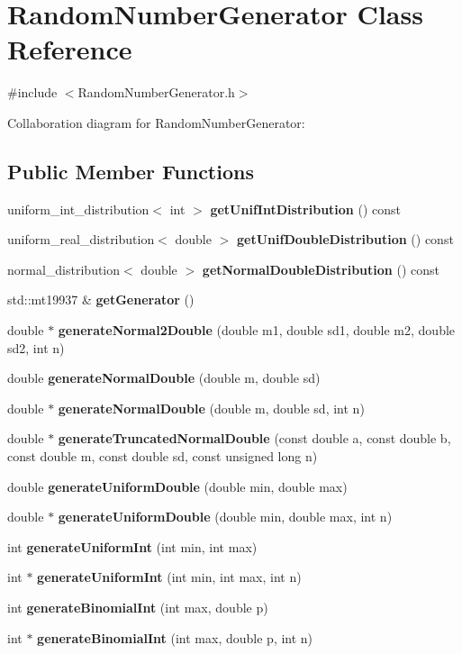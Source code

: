 \section{Random\+Number\+Generator Class Reference}
\label{class_random_number_generator}


{\ttfamily \#include $<$Random\+Number\+Generator.\+h$>$}



Collaboration diagram for Random\+Number\+Generator\+:
\subsection*{Public Member Functions}
\begin{DoxyCompactItemize}
\item 
uniform\+\_\+int\+\_\+distribution$<$ int $>$ \textbf{ get\+Unif\+Int\+Distribution} () const
\item 
uniform\+\_\+real\+\_\+distribution$<$ double $>$ \textbf{ get\+Unif\+Double\+Distribution} () const
\item 
normal\+\_\+distribution$<$ double $>$ \textbf{ get\+Normal\+Double\+Distribution} () const
\item 
std\+::mt19937 \& \textbf{ get\+Generator} ()
\item 
double $\ast$ \textbf{ generate\+Normal2\+Double} (double m1, double sd1, double m2, double sd2, int n)
\item 
double \textbf{ generate\+Normal\+Double} (double m, double sd)
\item 
double $\ast$ \textbf{ generate\+Normal\+Double} (double m, double sd, int n)
\item 
double $\ast$ \textbf{ generate\+Truncated\+Normal\+Double} (const double a, const double b, const double m, const double sd, const unsigned long n)
\item 
double \textbf{ generate\+Uniform\+Double} (double min, double max)
\item 
double $\ast$ \textbf{ generate\+Uniform\+Double} (double min, double max, int n)
\item 
int \textbf{ generate\+Uniform\+Int} (int min, int max)
\item 
int $\ast$ \textbf{ generate\+Uniform\+Int} (int min, int max, int n)
\item 
int \textbf{ generate\+Binomial\+Int} (int max, double p)
\item 
int $\ast$ \textbf{ generate\+Binomial\+Int} (int max, double p, int n)
\end{DoxyCompactItemize}
